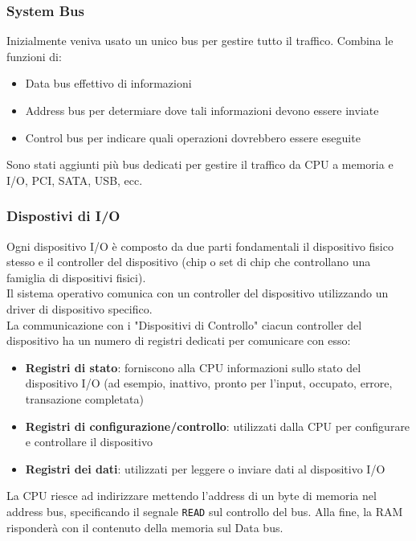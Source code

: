 \documentclass{article}
\begin{document}
    \subsubsection{System Bus}
    Inizialmente veniva usato un unico bus per gestire tutto il traffico. Combina le funzioni di: 
    \begin{itemize}
        \item Data bus effettivo di informazioni
        \item Address bus per determiare dove tali informazioni devono essere inviate
        \item Control bus per indicare quali operazioni dovrebbero essere eseguite
    \end{itemize}
    Sono stati aggiunti più bus dedicati per gestire il traffico da CPU a memoria e I/O, PCI, SATA, USB, ecc.
    
    \subsubsection{Dispostivi di I/O}
    Ogni dispositivo I/O è composto da due parti fondamentali il dispositivo fisico stesso e il controller del dispositivo (chip o set di chip che controllano una famiglia di dispositivi fisici).\\
    Il sistema operativo comunica con un controller del dispositivo utilizzando un driver di dispositivo specifico.\\
    La communicazione con i "Dispositivi di Controllo" ciacun controller del dispositivo ha un numero di registri dedicati per comunicare con esso:
    \begin{itemize}
        \item \textbf{Registri di stato}: forniscono alla CPU informazioni sullo stato del dispositivo I/O (ad esempio, inattivo, pronto per l'input, occupato, errore, transazione completata)
        \item \textbf{ Registri di configurazione/controllo}: utilizzati dalla CPU per configurare e controllare il dispositivo
        \item \textbf{Registri dei dati}: utilizzati per leggere o inviare dati al dispositivo I/O
    \end{itemize}
    La CPU riesce ad indirizzare mettendo l'address di un byte di memoria nel address bus, specificando il segnale \texttt{READ} sul controllo del bus. Alla fine, la RAM risponderà con il contenuto della memoria sul Data bus.
    
\end{document}
